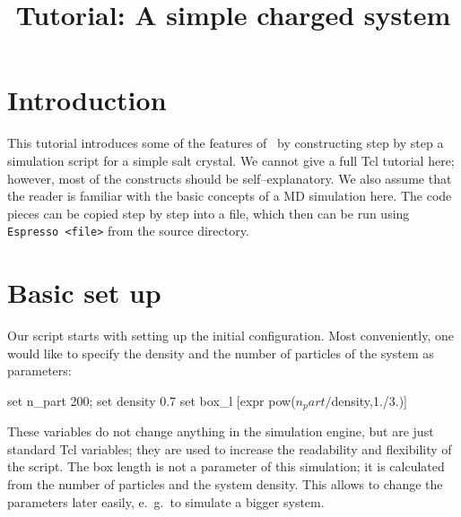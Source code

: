 \documentclass[
a4paper,                        %
11pt,                           %
twoside,                        %
footsepline,                    %
headsepline,                    %
headexclude,                    %
footexclude,                    %
pagesize,                       %
]{scrartcl}
\begin{document}
\esptitlehead
\title{Tutorial: A simple charged system}
\maketitle
\tableofcontents

\section{Introduction}

This tutorial introduces some of the features of \es\ by constructing
step by step a simulation script for a simple salt crystal.  We cannot
give a full Tcl tutorial here; however, most of the constructs should
be self--explanatory. We also assume that the reader is familiar with
the basic concepts of a MD simulation here. The code pieces can be
copied step by step into a file, which then can be run using
\verb|Espresso <file>| from the \es source directory.

\section{Basic set up}

Our script starts with setting up the initial configuration.  Most
conveniently, one would like to specify the density and the number of
particles of the system as parameters:
\begin{tclcode}
  set n_part 200; set density 0.7 set box_l [expr
  pow($n_part/$density,1./3.)]
\end{tclcode}
These variables do not change anything in the simulation engine, but
are just standard Tcl variables; they are used to increase the
readability and flexibility of the script. The box length is not a
parameter of this simulation; it is calculated from the number of
particles and the system density. This allows to change the parameters
later easily, e.~g.\ to simulate a bigger system.
\end{document}
